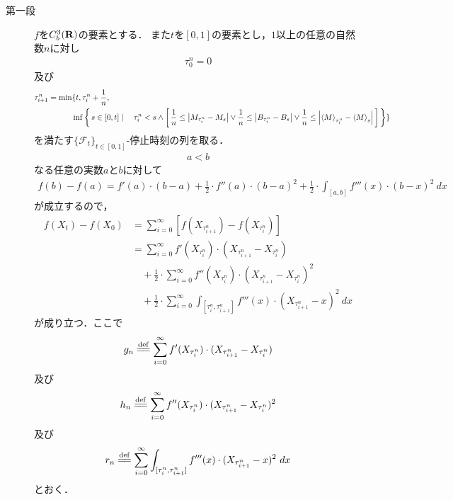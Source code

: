 	\begin{sketch}\mbox{}
		\begin{description}
			\item[第一段]
				$f$を$C^{3}_{b}(\mathbf{R})$の要素とする．
				また$t$を$[0,1]$の要素とし，$1$以上の任意の自然数$n$に対し
				\begin{align}
					\tau^{n}_{0} = 0
				\end{align}
				及び
				\begin{align}
					\tau^{n}_{i+1} = 
					\min&\{ t, \tau^{n}_{i} + \frac{1}{n}, \\
					&\inf{}{
						\Set{s \in [0,t]}{\tau^{n}_{i} < s \wedge \left[\, 
						\frac{1}{n} \leq \left|M_{\tau^{n}_{i}} - M_{s}\right| \vee
						\frac{1}{n} \leq \left|B_{\tau^{n}_{i}} - B_{s}\right| \vee
						\frac{1}{n} \leq \left|\inprod<M>_{\tau^{n}_{i}} - \inprod<M>_{s}\right|\, \right]}} \}
				\end{align}
				を満たす$\{\mathscr{F}_{t}\}_{t \in [0,1]}$-停止時刻の列を取る．
				\begin{align}
					a < b
				\end{align}
				なる任意の実数$a$と$b$に対して
				\begin{align}
					f(b) - f(a)
					= f'(a) \cdot (b-a) + \frac{1}{2} \cdot f''(a) \cdot (b-a)^{2}
					+ \frac{1}{2} \cdot \int_{[a,b]} f'''(x) \cdot (b-x)^{2}\ dx
				\end{align}
				が成立するので，
				\begin{align}
					f(X_{t}) - f(X_{0})
					&= \sum_{i=0}^{\infty} \left[ f(X_{\tau^{n}_{i+1}}) - f(X_{\tau^{n}_{i}}) \right] \\
					&= \sum_{i=0}^{\infty} f'(X_{\tau^{n}_{i}}) \cdot (X_{\tau^{n}_{i+1}} - X_{\tau^{n}_{i}}) \\
					&\quad + \frac{1}{2} \cdot \sum_{i=0}^{\infty} f''(X_{\tau^{n}_{i}}) \cdot (X_{\tau^{n}_{i+1}} - X_{\tau^{n}_{i}})^{2} \\
					&\quad + \frac{1}{2} \cdot \sum_{i=0}^{\infty} \int_{[\tau^{n}_{i},\tau^{n}_{i+1}]} f'''(x) \cdot (X_{\tau^{n}_{i+1}} - x)^{2}\ dx
				\end{align}
				が成り立つ．ここで
				\begin{align}
					g_{n} \defeq \sum_{i=0}^{\infty} f'(X_{\tau^{n}_{i}}) \cdot (X_{\tau^{n}_{i+1}} - X_{\tau^{n}_{i}})
				\end{align}
				及び
				\begin{align}
					h_{n} \defeq \sum_{i=0}^{\infty} f''(X_{\tau^{n}_{i}}) \cdot (X_{\tau^{n}_{i+1}} - X_{\tau^{n}_{i}})^{2}
				\end{align}
				及び
				\begin{align}
					r_{n} \defeq \sum_{i=0}^{\infty} \int_{[\tau^{n}_{i},\tau^{n}_{i+1}]} f'''(x) \cdot (X_{\tau^{n}_{i+1}} - x)^{2}\ dx
				\end{align}
				とおく．
				

\end{description}
\end{sketch}
